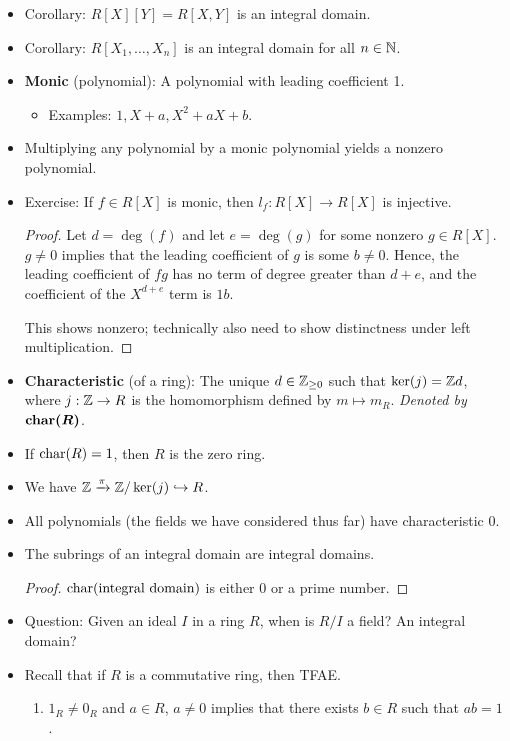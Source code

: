 \documentclass[../notes.tex]{subfiles}
\begin{document}
\begin{itemize}
\begin{proof}
    \end{proof}
    \item Corollary: $R[X][Y]=R[X,Y]$ is an integral domain.
    \item Corollary: $R[X_1,\dots,X_n]$ is an integral domain for all $n\in\mathbb{N}$.
    \item \textbf{Monic} (polynomial): A polynomial with leading coefficient 1.
    \begin{itemize}
        \item Examples: $1,X+a,X^2+aX+b$.
    \end{itemize}
    \item Multiplying any polynomial by a monic polynomial yields a nonzero polynomial.
    \item Exercise: If $f\in R[X]$ is monic, then $l_f:R[X]\to R[X]$ is injective.
    \begin{proof}
        Let $d=\deg(f)$ and let $e=\deg(g)$ for some nonzero $g\in R[X]$. $g\neq 0$ implies that the leading coefficient of $g$ is some $b\neq 0$. Hence, the leading coefficient of $fg$ has no term of degree greater than $d+e$, and the coefficient of the $X^{d+e}$ term is $1b$.\par
        This shows nonzero; technically also need to show distinctness under left multiplication.
    \end{proof}
    \item \textbf{Characteristic} (of a ring): The unique $d\in{\mathbb{Z}_{\geq 0}}$ such that $\ker(j)=\mathbb{Z} d$, where $j:\mathbb{Z}\to R$ is the homomorphism defined by $m\mapsto m_R$. \emph{Denoted by} $\bm{\chr(R)}$.
    \item If $\operatorname{char}(R)=1$, then $R$ is the zero ring.
    \item We have $\mathbb{Z}\xrightarrow{\pi}\mathbb{Z}/\ker(j)\hookrightarrow R$.
    \item All polynomials (the fields we have considered thus far) have characteristic 0.
    \item The subrings of an integral domain are integral domains.
    \begin{proof}
        $\operatorname{char}(\text{integral domain})$ is either 0 or a prime number.
    \end{proof}
    \item Question: Given an ideal $I$ in a ring $R$, when is $R/I$ a field? An integral domain?
    \item Recall that if $R$ is a commutative ring, then TFAE.
        \begin{enumerate}
            \item $1_R\neq 0_R$ and $a\in R$, $a\neq 0$ implies that there exists $b\in R$ such that $ab=1$.

\end{enumerate}
\end{itemize}
\end{document}
